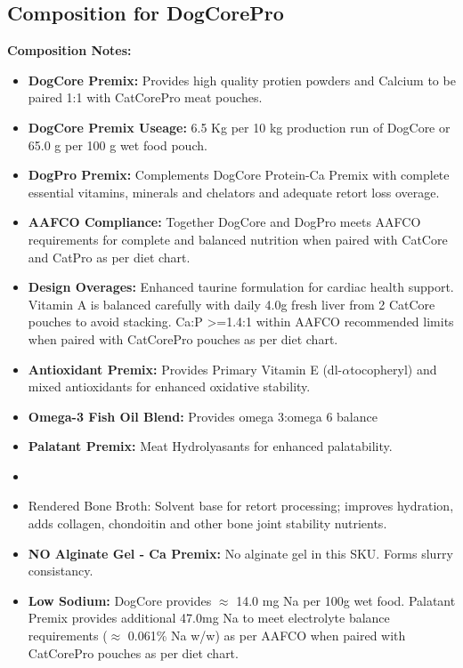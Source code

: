 \subsection*{Composition for DogCorePro}

\noindent\textbf{Composition Notes:}
\begin{itemize}
\item\textbf {DogCore Premix: } Provides high quality protien powders and Calcium to be paired 1:1 with CatCorePro meat pouches.
\item \textbf{DogCore Premix Useage: }6.5 Kg per 10 kg production run of DogCore or 65.0 g per 100 g wet food pouch.
\item \textbf{DogPro Premix: } Complements DogCore Protein-Ca Premix with complete essential vitamins, minerals and chelators and adequate retort loss overage. 
\item\textbf{AAFCO Compliance: } Together DogCore and DogPro meets AAFCO requirements for complete and balanced nutrition when paired with CatCore and CatPro as per diet chart. 
\item\textbf{Design Overages: }Enhanced taurine formulation for cardiac health support. Vitamin A is balanced carefully with daily 4.0g fresh liver from 2 CatCore pouches to avoid stacking. Ca:P >=1.4:1 within AAFCO recommended limits when paired with CatCorePro pouches as per diet chart. 
\item \textbf{Antioxidant Premix: } Provides Primary Vitamin E (dl-$\alpha$tocopheryl) and mixed antioxidants for enhanced oxidative stability.
\item \textbf{Omega-3 Fish Oil Blend:} Provides omega 3:omega 6  balance
\item \textbf{Palatant Premix: } Meat Hydrolyasants for enhanced palatability.
\item\item{Rendered Bone Broth: } Solvent base for retort processing; improves hydration, adds collagen, chondoitin and other bone joint stability nutrients. 
\item \textbf{NO Alginate Gel - Ca Premix:} No alginate gel in this SKU. Forms slurry consistancy. 
\item \textbf{Low Sodium:} DogCore provides $\approx$ 14.0 mg Na per 100g wet food. Palatant Premix provides additional 47.0mg Na to meet electrolyte balance requirements ($\approx$ 0.061\% Na w/w) as per AAFCO when paired with CatCorePro pouches as per diet chart. 
\end{itemize}


